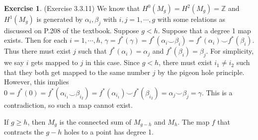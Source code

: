 \documentclass[12pt, psamsfonts]{amsart}
\theoremstyle{definition}
\newtheorem*{exer}{Exercise}
\theoremstyle{remark}
\numberwithin{equation}{section}
\begin{document}
\begin{exer}{(Exercise 3.3.11)}
  We know that $H^0(M_g) = H^2(M_g) = \mathbb{Z}$ and $H^1(M_g)$ is generated by $\alpha_i, \beta_j$ with $i, j = 1, \cdots, g$ with some relations as discussed on P.208 of the textbook.
  Suppose $g < h$.
  Suppose that a degree 1 map exists.
  Then for each $i = 1, \cdots, h$, $\gamma = f^{\ast}(\gamma) = f^{\ast}(\alpha_i \smile \beta_i) = f^{\ast}(\alpha_i) \smile f^{\ast}(\beta_i)$.
  Thus there must exist $j$ such that $f^{\ast}(\alpha_i) = \alpha_j$ and $f^{\ast}(\beta_i) = \beta_j$.
  For simplicity, we say $i$ gets mapped to $j$ in this case.
  Since $g < h$, there must exist $i_1 \ne i_2$ such that they both get mapped to the same number $j$ by the pigeon hole principle.
  However, this implies $0 = f^{\ast}(0) = f^{\ast}(\alpha_{i_1} \smile \beta_{i_2}) = f^{\ast}(\alpha_{i_1}) \smile f^{\ast}(\beta_{i_2}) = \alpha_j \smile \beta_j = \gamma$.
  This is a contradiction, so such a map cannot exist.

  If $g \geq h$, then $M_g$ is the connected sum of $M_{g - h}$ and $M_h$.
  The map $f$ that contracts the $g - h$ holes to a point has degree 1.
\end{exer}
\end{document}
